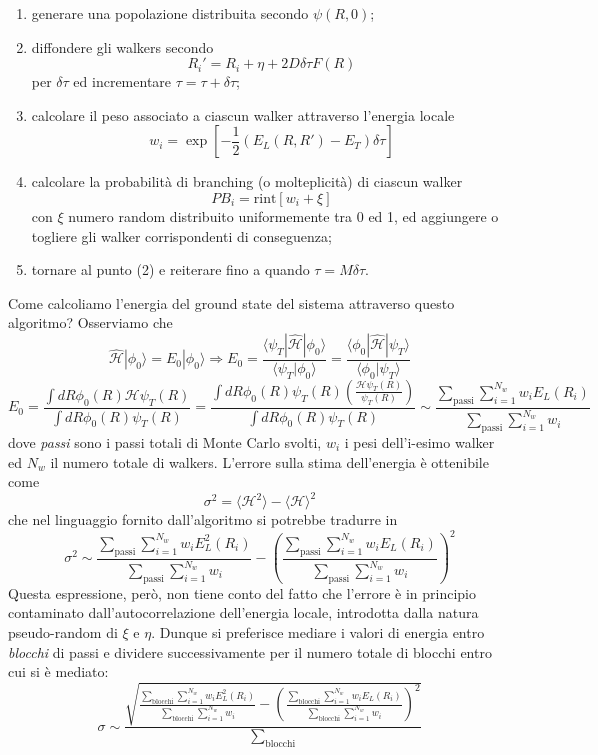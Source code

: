 \documentclass[11pt,a4paper]{article}
\begin{document}
\begin{enumerate}
	\item generare una popolazione distribuita secondo $\psi(R,0)$;
	\item diffondere gli walkers secondo 
	\[
	R_i' = R_i + \eta + 2D\delta \tau F(R)
	\]
	per $\delta \tau$ ed incrementare $\tau = \tau + \delta\tau$;
	\item calcolare il peso associato a ciascun walker attraverso l'energia locale 
	\[
	w_i = \exp\left[ -\frac{1}{2}(E_L(R,R')-E_T)\delta \tau \right]
	\]
	\item calcolare la probabilità di branching (o molteplicità) di ciascun walker 
	\[
	PB_i = \text{rint}\left[ w_i + \xi\right]
	\]
	con $\xi$ numero random distribuito uniformemente tra 0 ed 1, ed aggiungere o togliere gli walker corrispondenti di conseguenza;
	\item tornare al punto (2) e reiterare fino a quando $\tau = M \delta \tau$.  
\end{enumerate}
Come calcoliamo l'energia del ground state del sistema attraverso questo algoritmo? Osserviamo che
\[
\mathcal{\hat{H}}|\phi_0\rangle = E_0|\phi_0\rangle \Rightarrow E_0 = \frac{\langle \psi_T|\mathcal{\hat{H}}|\phi_0\rangle}{\langle \psi_T|\phi_0\rangle} = \frac{\langle \phi_0|\mathcal{\hat{H}}|\psi_T\rangle}{\langle \phi_0|\psi_T\rangle}
\]
\[
E_0 = \frac{\int dR \phi_0(R)\mathcal{H}\psi_T(R)}{\int dR \phi_0(R)\psi_T(R)} = \frac{\int dR \phi_0(R)\psi_T(R)\left(\frac{\mathcal{H}\psi_T(R)}{\psi_T(R)}\right)}{\int dR \phi_0(R)\psi_T(R)} \sim \frac{\sum_{\text{passi}}\sum_{i=1}^{N_w} w_i E_L(R_i)}{\sum_{\text{passi}}\sum_{i=1}^{N_w} w_i}
\]
dove \emph{passi} sono i passi totali di Monte Carlo svolti, $w_i$ i pesi dell'i-esimo walker ed $N_w$ il numero totale di walkers. L'errore sulla stima dell'energia è ottenibile come
\begin{equation}
\sigma^2 = \langle \mathcal{H} ^2\rangle - \langle \mathcal{H} \rangle^2
\end{equation}
che nel linguaggio fornito dall'algoritmo si potrebbe tradurre in
\[
\sigma^2 \sim \frac{\sum_{\text{passi}}\sum_{i=1}^{N_w} w_i E_L^2(R_i)}{\sum_{\text{passi}}\sum_{i=1}^{N_w} w_i} - \left(\frac{\sum_{\text{passi}}\sum_{i=1}^{N_w} w_i E_L(R_i)}{\sum_{\text{passi}}\sum_{i=1}^{N_w} w_i}\right)^2
\]
Questa espressione, però, non tiene conto del fatto che l'errore è in principio contaminato dall'autocorrelazione dell'energia locale, introdotta dalla natura pseudo-random di $\xi$ e $\eta$. Dunque si preferisce mediare i valori di energia entro \emph{blocchi} di passi e dividere successivamente per il numero totale di blocchi entro cui si è mediato:
\begin{equation}
\sigma \sim \frac{ \sqrt{\frac{\sum_{\text{blocchi}}\sum_{i=1}^{N_w} w_i E_L^2(R_i)}{\sum_{\text{blocchi}}\sum_{i=1}^{N_w} w_i} - \left(\frac{\sum_{\text{blocchi}}\sum_{i=1}^{N_w} w_i E_L(R_i)}{\sum_{\text{blocchi}}\sum_{i=1}^{N_w} w_i}\right)^2} }{\sum_{\text{blocchi}}}
\end{equation}
\end{document}
